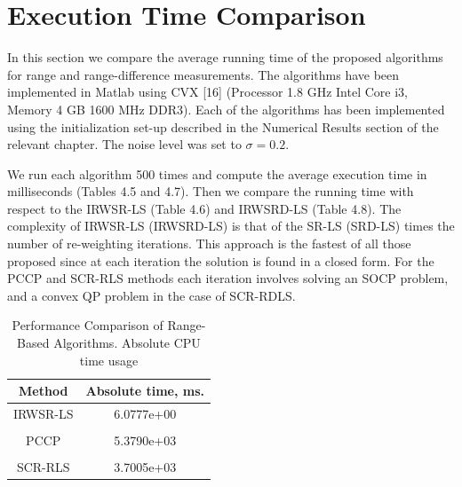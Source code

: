 \phantom{m}




\section{Execution Time Comparison}

In this section we compare the average running time of the proposed algorithms for range and range-difference measurements. The algorithms have been implemented in Matlab using CVX [16] (Processor 1.8 GHz Intel Core i3, Memory 4 GB 1600 MHz DDR3). Each of the algorithms has been implemented using the initialization set-up described in the Numerical Results section of the relevant chapter. The noise level was set to $\sigma = 0.2$.

We run each algorithm 500 times and compute the average execution time in milliseconds (Tables 4.5 and 4.7). Then we compare the running time with respect to the IRWSR-LS (Table 4.6) and IRWSRD-LS (Table 4.8). The complexity of IRWSR-LS (IRWSRD-LS) is that of the SR-LS (SRD-LS) times the number of re-weighting iterations. This approach is the fastest of all those proposed since at each iteration the solution is found in a closed form.  For the PCCP and SCR-RLS methods  each iteration involves solving an SOCP problem, and a convex QP problem in the case of SCR-RDLS.

\begin{table}[h]
\label{tab:absR}
\centering
\caption{Performance Comparison of Range-Based Algorithms. Absolute CPU time usage}
\phantom{m}
\begin{tabular}{|c|c|} 
\hline
Method &  Absolute time, ms.\\ \hline
IRWSR-LS  & 6.0777e+00 \\&\\
PCCP & 5.3790e+03 \\&\\
SCR-RLS & 3.7005e+03  \\ %
\hline
\end{tabular}
\end{table}


